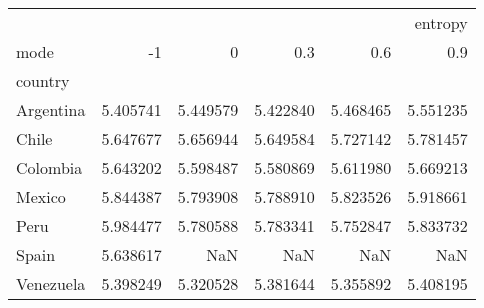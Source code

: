 \begin{tabular}{lrrrrr}
\toprule
 & \multicolumn{5}{r}{entropy} \\
mode & -1 & 0 & 0.3 & 0.6 & 0.9 \\
country &  &  &  &  &  \\
\midrule
Argentina & 5.405741 & 5.449579 & 5.422840 & 5.468465 & 5.551235 \\
Chile & 5.647677 & 5.656944 & 5.649584 & 5.727142 & 5.781457 \\
Colombia & 5.643202 & 5.598487 & 5.580869 & 5.611980 & 5.669213 \\
Mexico & 5.844387 & 5.793908 & 5.788910 & 5.823526 & 5.918661 \\
Peru & 5.984477 & 5.780588 & 5.783341 & 5.752847 & 5.833732 \\
Spain & 5.638617 & NaN & NaN & NaN & NaN \\
Venezuela & 5.398249 & 5.320528 & 5.381644 & 5.355892 & 5.408195 \\
\bottomrule
\end{tabular}
